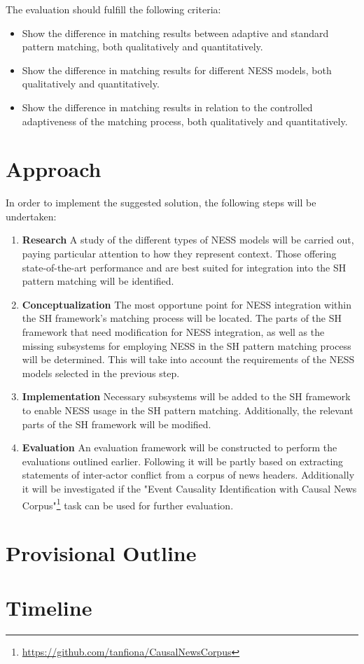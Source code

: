\documentclass[11pt]{scrreprt}
\let\citef\cite  %
\let\cite\parencite  %
\begin{document}
The evaluation should fulfill the following criteria:

\begin{itemize}
	\item Show the difference in matching results between adaptive and standard pattern matching, both qualitatively and quantitatively.
	\item Show the difference in matching results for different NESS models, both qualitatively and quantitatively.
	\item Show the difference in matching results in relation to the controlled adaptiveness of the matching process, both qualitatively and quantitatively.


\end{itemize}

\section{Approach}
In order to implement the suggested solution, the following steps will be undertaken:

\begin{enumerate}
 	\item \textbf{Research}
	A study of the different types of NESS models will be carried out, paying particular attention to how they represent context. Those offering state-of-the-art performance and are best suited for integration into the SH pattern matching will be identified.
 	\item \textbf{Conceptualization}
 	The most opportune point for NESS integration within the SH framework's matching process will be located. The parts of the SH framework that need modification for NESS integration, as well as the missing subsystems for employing NESS in the SH pattern matching process will be determined. This will take into account the requirements of the NESS models selected in the previous step.
 	\item \textbf{Implementation}
	Necessary subsystems will be added to the SH framework to enable NESS usage in the SH pattern matching. Additionally, the relevant parts of the SH framework will be modified.
 	\item \textbf{Evaluation}
 	An evaluation framework will be constructed to perform the evaluations outlined earlier. Following \citef{menezesSemanticHypergraphs2021} it will be partly based on extracting statements of inter-actor conflict from a  corpus of news headers. Additionally it will be investigated if the "Event Causality Identification with Causal News Corpus"\footnote{\url{https://github.com/tanfiona/CausalNewsCorpus}} task can be used for further evaluation.
 	
\end{enumerate}


\newpage
\section{Provisional Outline}

\makeatletter

\makeatother


\newpage
\section{Timeline}





\printbibliography[title={References}]
\end{document}
